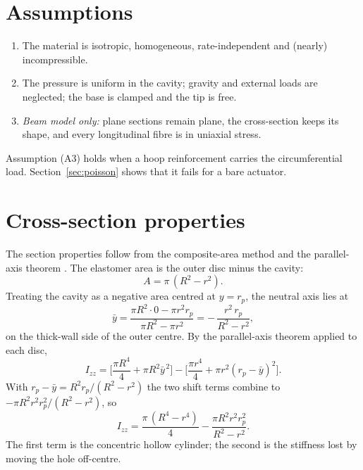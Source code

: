 \documentclass[12pt,a4paper,oneside]{report}
\numberwithin{equation}{chapter}
\numberwithin{figure}{chapter}
\numberwithin{table}{chapter}
\newcommand{\Izz}{I_{zz}}
\newcommand{\rp}{r_p}
\begin{document}
\section{Assumptions}
\begin{enumerate}[label=(A\arabic*)]
\item The material is isotropic, homogeneous, rate-independent and (nearly) incompressible.
\item The pressure is uniform in the cavity; gravity and external loads are neglected; the base is clamped
and the tip is free.
\item \emph{Beam model only:} plane sections remain plane, the cross-section keeps its shape, and every
longitudinal fibre is in uniaxial stress.
\end{enumerate}
Assumption (A3) holds when a hoop reinforcement carries the circumferential load. Section~\ref{sec:poisson}
shows that it fails for a bare actuator.

\section{Cross-section properties}\label{sec:section}
The section properties follow from the composite-area method and the parallel-axis theorem
\cite{gere2013}. The elastomer area is the outer disc minus the cavity:
\begin{equation}
A = \pi\,(R^2-r^2). \label{eq:A}
\end{equation}
Treating the cavity as a negative area centred at $y=\rp$, the neutral axis lies at
\begin{equation}
\bar y = \frac{\pi R^2\cdot 0 - \pi r^2\rp}{\pi R^2-\pi r^2} = -\,\frac{r^2\,\rp}{R^2-r^2}, \label{eq:ybar}
\end{equation}
on the thick-wall side of the outer centre. By the parallel-axis theorem applied to each disc,
\begin{equation}
\Izz = \Big[\frac{\pi R^4}{4} + \pi R^2\bar y^{\,2}\Big] - \Big[\frac{\pi r^4}{4} + \pi r^2(\rp-\bar y)^2\Big].
\end{equation}
With $\rp-\bar y = R^2\rp/(R^2-r^2)$ the two shift terms combine to $-\pi R^2r^2\rp^2/(R^2-r^2)$, so
\begin{equation}
\Izz = \frac{\pi\,(R^4-r^4)}{4} - \frac{\pi R^2 r^2 \rp^2}{R^2-r^2}. \label{eq:I}
\end{equation}
The first term is the concentric hollow cylinder; the second is the stiffness lost by moving the hole
off-centre.
\end{document}
